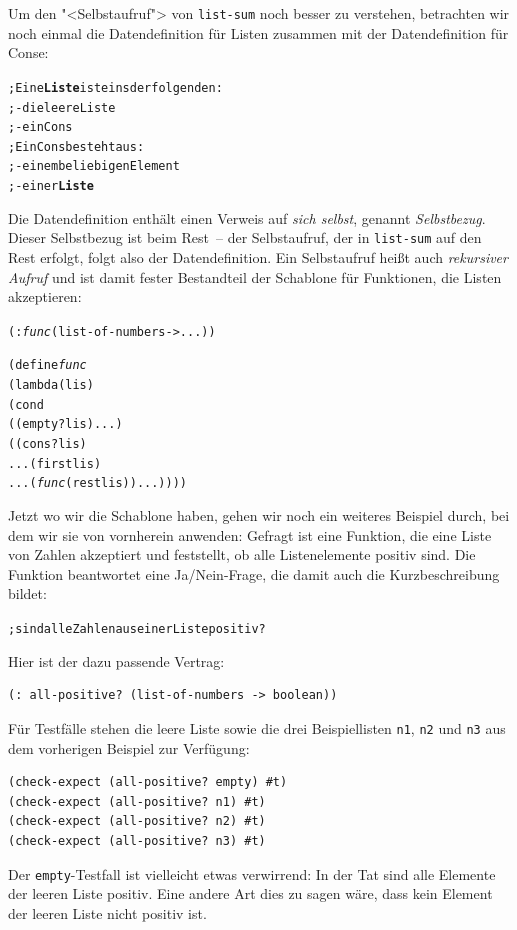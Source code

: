 Um den "<Selbstaufruf"> von \texttt{list-sum} noch besser zu
verstehen, betrachten wir noch einmal die Datendefinition für
Listen zusammen mit der Datendefinition für Conse:

\begin{alltt}
; Eine \textbf{Liste} ist eins der folgenden:
; - die leere Liste
; - ein Cons
; Ein Cons besteht aus:
; - einem beliebigen Element
; - einer \textbf{Liste}
\end{alltt}
%
Die Datendefinition enthält einen Verweis auf \emph{sich selbst},
genannt \emph{Selbstbezug}.  Dieser Selbstbezug ist
beim Rest~-- der Selbstaufruf, der in \texttt{list-sum} auf den Rest
erfolgt, folgt also der Datendefinition.  Ein Selbstaufruf
heißt auch \textit{rekursiver Aufruf} und ist
damit fester Bestandteil der Schablone für Funktionen, die Listen
akzeptieren:
%
\begin{alltt}
(: \textit{func} (list-of-numbers -> ...))

(define \textit{func}
  (lambda (lis)
    (cond
      ((empty? lis) ...)
      ((cons? lis)
       ... (first lis)
       ... (\textit{func} (rest lis)) ...))))
\end{alltt}
%
Jetzt wo wir die Schablone haben, gehen wir noch ein weiteres Beispiel
durch, bei dem wir sie von vornherein anwenden:  Gefragt ist eine
Funktion, die eine Liste von Zahlen akzeptiert und feststellt, ob alle
Listenelemente  positiv sind.  Die Funktion beantwortet eine
Ja/Nein-Frage, die damit auch die Kurzbeschreibung bildet:
%
\begin{alltt}
; sind alle Zahlen aus einer Liste positiv?
\end{alltt}
%
Hier ist der dazu passende Vertrag:
%
\begin{verbatim}
(: all-positive? (list-of-numbers -> boolean))
\end{verbatim}
%
Für Testfälle stehen die leere Liste sowie die drei Beispiellisten
\texttt{n1}, \texttt{n2} und \texttt{n3} aus dem vorherigen Beispiel
zur Verfügung:
%
\begin{verbatim}
(check-expect (all-positive? empty) #t)
(check-expect (all-positive? n1) #t)
(check-expect (all-positive? n2) #t)
(check-expect (all-positive? n3) #t)
\end{verbatim}
%
Der \texttt{empty}-Testfall ist vielleicht etwas verwirrend: In der
Tat sind alle Elemente der leeren Liste positiv.  Eine andere Art dies
zu sagen wäre, dass kein Element der leeren Liste nicht positiv ist.


